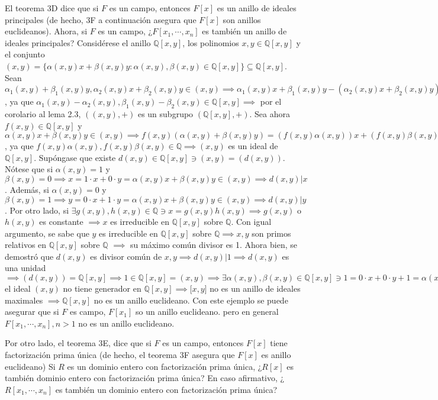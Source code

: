 \begin{ejemplo}
    El teorema 3D dice que si $F$ es un campo, entonces $F[x]$ es un anillo de ideales principales (de hecho, 3F a continuación asegura que $F[x]$ son anillos euclideanos). Ahora, si $F$ es un campo, ¿$F[x_1,\cdots,x_n]$ es también un anillo de ideales principales? Considérese el anillo $\mathbb{Q}[x,y]$, los polinomios $x,y\in \mathbb{Q}[x,y]$ y el conjunto $(x,y)=\{\alpha(x,y)x+\beta(x,y)y:\alpha(x,y),\beta(x,y)\in\mathbb{Q}[x,y]\}\subseteq \mathbb{Q}[x,y]$. Sean $\alpha_1(x,y)+\beta_1(x,y)y,\alpha_2(x,y)x+\beta_2(x,y)y\in (x,y)\implies \alpha_1(x,y)x+\beta_1(x,y)y-(\alpha_2(x,y)x+\beta_2(x,y)y)=(\alpha_1(x,y)-\alpha_2(x,y))x+(\beta_1(x,y)-\beta_2(x,y))y\in (x,y)$, ya que $\alpha_1(x,y)-\alpha_2(x,y),\beta_1(x,y)-\beta_2(x,y)\in\mathbb{Q}[x,y]\implies$ por el corolario al lema 2.3, $((x,y),+)$ es un subgrupo $(\mathbb{Q}[x,y],+)$. Sea ahora $f(x,y)\in \mathbb{Q}[x,y]$ y $\alpha(x,y)x+\beta(x,y)y\in (x,y)\implies f(x,y)(\alpha(x,y)+\beta(x,y)y)=(f(x,y)\alpha(x,y))x+(f(x,y)\beta(x,y))y\in (x,y)$, ya que $f(x,y)\alpha(x,y),f(x,y)\beta(x,y)\in\mathbb{Q}\implies (x,y)$ es un ideal de $\mathbb{Q}[x,y]$.\bigbreak 
    Supóngase que existe $d(x,y)\in \mathbb{Q}[x,y]\ni (x,y)=(d(x,y))$. Nótese que si $\alpha(x,y)=1$ y $\beta(x,y)=0\implies x=1\cdot x+0\cdot y=\alpha(x,y)x+\beta(x,y)y\in (x,y)\implies d(x,y)|x$. Además, si $\alpha(x,y)=0$ y $\beta(x,y)=1\implies y=0\cdot x+1\cdot y=\alpha(x,y)x+\beta(x,y)y\in (x,y)\implies d(x,y)|y$. Por otro lado, si $\exists g(x,y),h(x,y)\in\mathbb{Q}\ni x=g(x,y)h(x,y)\implies g(x,y)$ o $h(x,y)$ es constante $\implies x$ es irreducible en $\mathbb{Q}[x,y]$ sobre $\mathbb{Q}$. Con igual argumento, se sabe que $y$ es irreducible en $\mathbb{Q}[x,y]$ sobre $\mathbb{Q}\implies x,y$ son primos relativos en $\mathbb{Q}[x,y]$ sobre $\mathbb{Q}$ $\implies$ su máximo común divisor es 1. Ahora bien, se demostró que $d(x,y)$ es divisor común de $x,y\implies d(x,y)|1\implies d(x,y)$ es una unidad $\implies (d(x,y))=\mathbb{Q}[x,y]\implies 1\in \mathbb{Q}[x,y]=(x,y)\implies \exists \alpha(x,y),\beta(x,y)\in\mathbb{Q}[x,y]\ni 1=0\cdot x+0\cdot y +1=\alpha(x,y)x+\beta(x,y)y+0\implies 1=0(\to\gets)$ el ideal $(x,y)$ no tiene generador en $\mathbb{Q}[x,y]\implies \mathbb[x,y]$ no es un anillo de ideales maximales $\implies \mathbb{Q}[x,y]$ no es un anillo euclideano. Con este ejemplo se puede asegurar que si $F$ es campo, $F[x_1]$ so un anillo euclideano. pero en general $F[x_1,\cdots,x_n],n>1$ no es un anillo euclideano.\bigbreak

    Por otro lado, el teorema 3E, dice que si $F$ es un campo, entonces $F[x]$ tiene factorización prima única (de hecho, el teorema 3F asegura que $F[x]$ es anillo euclideano)\bigbreak 
    Si $R$ es un dominio entero con factorización prima única, ¿$R[x]$ es también dominio entero con factorización prima única? En caso afirmativo, ¿$R[x_1,\cdots,x_n]$ es también un dominio entero con factorización prima única? 
\end{ejemplo}

